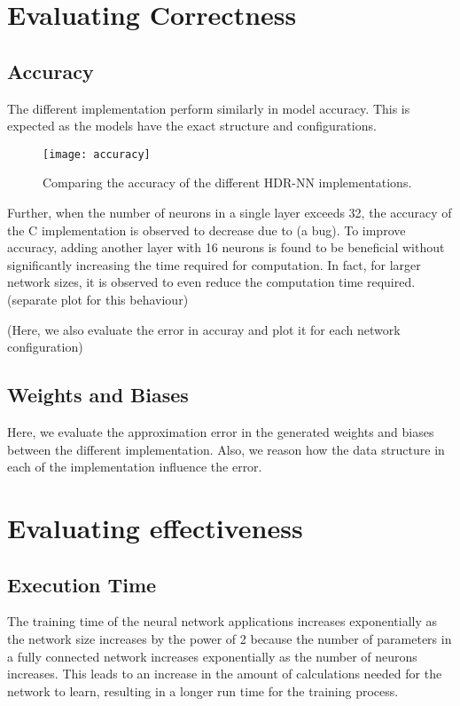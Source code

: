 \section{Evaluating Correctness}
\subsection{Accuracy}
The different implementation perform similarly in model accuracy. This is expected as the models have the exact structure and configurations.
\begin{figure}[ht]
	\centering
	\texttt{[image: accuracy]}
	\caption[HDR-NN Accuracy]{Comparing the accuracy of the different HDR-NN implementations.}
\end{figure}
Further, when the number of neurons in a single layer exceeds 32, the accuracy of the C implementation is observed to decrease due to (a bug). To improve accuracy, adding another layer with 16 neurons is found to be beneficial without significantly increasing the time required for computation. In fact, for larger network sizes, it is observed to even reduce the computation time required. (separate plot for this behaviour)

(Here, we also evaluate the error in accuray and plot it for each network configuration)

\subsection{Weights and Biases}
Here, we evaluate the approximation error in the generated weights and biases between the different implementation. Also, we reason how the data structure in each of the implementation influence the error.


\section{Evaluating effectiveness}
\subsection{Execution Time}
The training time of the neural network applications increases exponentially as the network size increases by the power of 2 because the number of parameters in a fully connected network increases exponentially as the number of neurons increases. This leads to an increase in the amount of calculations needed for the network to learn, resulting in a longer run time for the training process.

